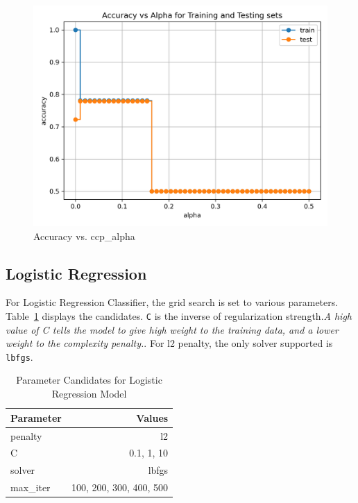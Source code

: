 \begin{figure}
    \centering
    \includegraphics[width=1\linewidth]{docs//assets/accuracy_vs_alpha.png}
    \caption{Accuracy vs. ccp\_alpha}
    \label{fig:ccp}
\end{figure}


\subsection{Logistic Regression}

For Logistic Regression Classifier, the grid search is set to various parameters. Table~\ref{tab:parameters-logreg} displays the candidates. \texttt{C} is the inverse of regularization strength.\textit{A high value of C tells the model to give high weight to the training data, and a lower weight to the complexity penalty.}\cite{stack_overflow_c_parameter}. For l2 penalty, the only solver supported is \texttt{lbfgs}.

\begin{table}[h]
\centering
\begin{tabular}{|l|r|}
\hline
\textbf{Parameter} & \textbf{Values}            \\ \hline
penalty            & l2                         \\ \hline
C                  & 0.1, 1, 10                \\ \hline
solver             & lbfgs                      \\ \hline
max\_iter          & 100, 200, 300, 400, 500    \\ \hline
\end{tabular}
\caption{Parameter Candidates for Logistic Regression Model}
\label{tab:parameters-logreg}
\end{table}

